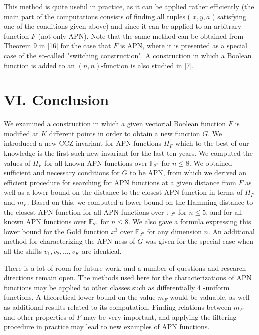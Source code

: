 \documentclass[10pt]{article}
\begin{document}
This method is quite useful in practice, as it can be applied rather efficiently (the main part of the computations consists of finding all tuples ( $x, y, a$ ) satisfying one of the conditions given above) and since it can be applied to an arbitrary function $F$ (not only APN). Note that the same method can be obtained from Theorem 9 in [16] for the case that $F$ is APN, where it is presented as a special case of the so-called "switching construction". A construction in which a Boolean function is added to an $(n, n)$-function is also studied in [7].

\section*{VI. Conclusion}
We examined a construction in which a given vectorial Boolean function $F$ is modified at $K$ different points in order to obtain a new function $G$. We introduced a new CCZ-invariant for APN functions $\Pi_{F}$ which to the best of our knowledge is the first such new invariant for the last ten years. We computed the values of $\Pi_{F}$ for all known APN functions over $\mathbb{F}_{2^{n}}$ for $n \leq 8$. We obtained sufficient and necessary conditions for $G$ to be APN, from which we derived an efficient procedure for searching for APN functions at a given distance from $F$ as well as a lower bound on the distance to the closest APN function in terms of $\Pi_{F}$ and $m_{F}$. Based on this, we computed a lower bound on the Hamming distance to the closest APN function for all APN functions over $\mathbb{F}_{2^{n}}$ for $n \leq 5$, and for all known APN functions over $\mathbb{F}_{2^{n}}$ for $n \leq 8$. We also gave a formula expressing this lower bound for the Gold function $x^{3}$ over $\mathbb{F}_{2^{n}}$ for any dimension $n$. An additional method for characterizing the APN-ness of $G$ was given for the special case when all the shifts $v_{1}, v_{2}, \ldots, v_{K}$ are identical.

There is a lot of room for future work, and a number of questions and research directions remain open. The methods used here for the characterizations of APN functions may be applied to other classes such as differentially 4 -uniform functions. A theoretical lower bound on the value $m_{F}$ would be valuable, as well as additional results related to its computation. Finding relations between $m_{F}$ and other properties of $F$ may be very important, and applying the filtering procedure in practice may lead to new examples of APN functions.
\end{document}
